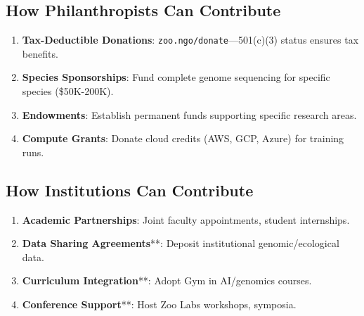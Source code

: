 \subsection{How Philanthropists Can Contribute}

\begin{enumerate}
    \item \textbf{Tax-Deductible Donations}: \texttt{zoo.ngo/donate}—501(c)(3) status ensures tax benefits.
    \item \textbf{Species Sponsorships}: Fund complete genome sequencing for specific species (\$50K-200K).
    \item \textbf{Endowments}: Establish permanent funds supporting specific research areas.
    \item \textbf{Compute Grants}: Donate cloud credits (AWS, GCP, Azure) for training runs.
\end{enumerate}

\subsection{How Institutions Can Contribute}

\begin{enumerate}
    \item \textbf{Academic Partnerships}: Joint faculty appointments, student internships.
    \item \textbf{Data Sharing Agreements}**: Deposit institutional genomic/ecological data.
    \item \textbf{Curriculum Integration}**: Adopt Gym in AI/genomics courses.
    \item \textbf{Conference Support}**: Host Zoo Labs workshops, symposia.
\end{enumerate}

